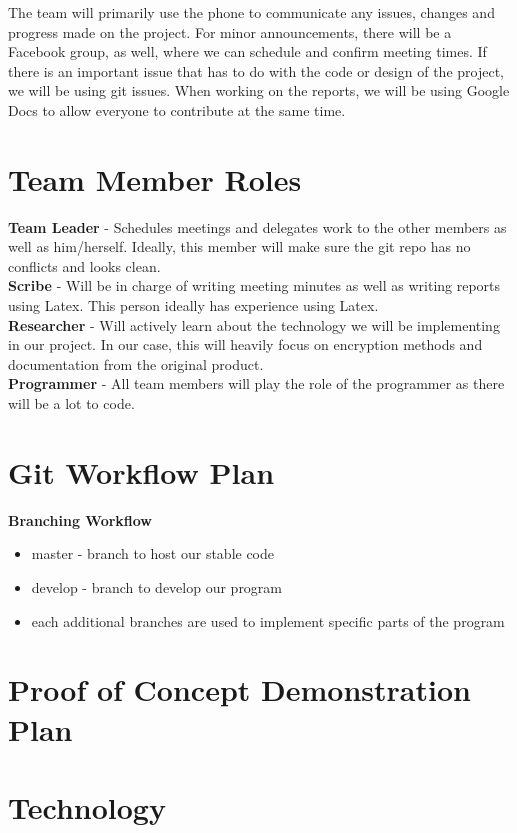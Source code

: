\documentclass{article}
\begin{document}
The team will primarily use the phone to communicate any issues, changes and progress made on the project. For minor announcements, there will be a Facebook group, as well, where we can schedule and confirm meeting times. If there is an important issue that has to do with the code or design of the project, we will be using git issues. When working on the reports, we will be using Google Docs to allow everyone to contribute at the same time.

\section{Team Member Roles}

\textbf{Team Leader} - Schedules meetings and delegates work to the other members as well as him/herself. Ideally, this member will make sure the git repo has no conflicts and looks clean.\\
\textbf{Scribe} - Will be in charge of writing meeting minutes as well as writing reports using Latex. This person ideally has experience using Latex.\\
\textbf{Researcher} - Will actively learn about the technology we will be implementing in our project. In our case, this will heavily focus on encryption methods and documentation from the original product.\\
\textbf{Programmer} - All team members will play the role of the programmer as there will be a lot to code.\\

\section{Git Workflow Plan}

\textbf{Branching Workflow}
\begin{itemize}
    \item master - branch to host our stable code
    \item develop - branch to develop our program
    \item each additional branches are used to implement specific parts of the program
\end{itemize}

\section{Proof of Concept Demonstration Plan}



\section{Technology}
\end{document}
